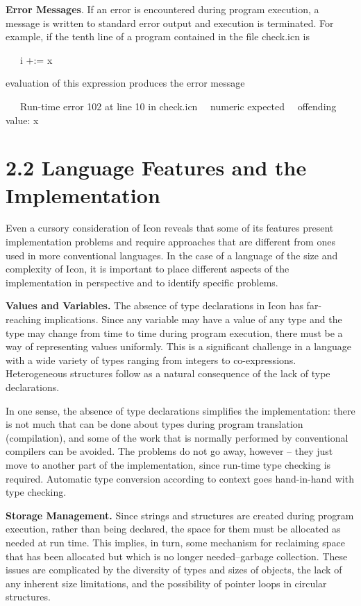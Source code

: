 \textbf{Error Messages}. If an error is encountered during program
execution, a message is written to standard error output and execution
is terminated. For example, if the tenth line of a program contained
in the file check.icn is

{\ttfamily\mdseries
\ \ \ i +:= {\textquotedbl}x{\textquotedbl}}

\noindent
evaluation of this expression produces the error message

{\ttfamily\mdseries
\ \ \ Run-time error 102 at line 10 in check.icn\newline
 \ \ numeric expected\newline
 \ \ offending value: {\textquotedbl}x{\textquotedbl}}


\section[2.2 Language Features and the Implementation]{2.2 Language Features and the Implementation}

Even a cursory consideration of Icon reveals that some of its features
present implementation problems and require approaches that are
different from ones used in more conventional languages. In the case
of a language of the size and complexity of Icon, it is important to
place different aspects of the implementation in perspective and to
identify specific problems.


\textbf{Values and Variables.} The absence of type declarations in
Icon has far-reaching implications. Since any variable may have a
value of any type and the type may change from time to time during
program execution, there must be a way of representing values
uniformly. This is a significant challenge in a language with a wide
variety of types ranging from integers to
co-expressions. Heterogeneous structures follow as a natural
consequence of the lack of type declarations.

In one sense, the absence of type declarations simplifies the
implementation: there is not much that can be done about types during
program translation (compilation), and some of the work that is
normally performed by conventional compilers can be avoided. The
problems do not go away, however -- they just move to another part of
the implementation, since run-time type checking is
required. Automatic type conversion according to context goes
hand-in-hand with type checking.


\textbf{Storage Management.} Since strings and structures are created
during program execution, rather than being declared, the space for
them must be allocated as needed at run time. This implies, in turn,
some mechanism for reclaiming space that has been allocated but which
is no longer needed--{\textquotedbl}garbage collection.{\textquotedbl}
These issues are complicated by the diversity of types and sizes of
objects, the lack of any inherent size limitations, and the
possibility of pointer loops in circular structures.


